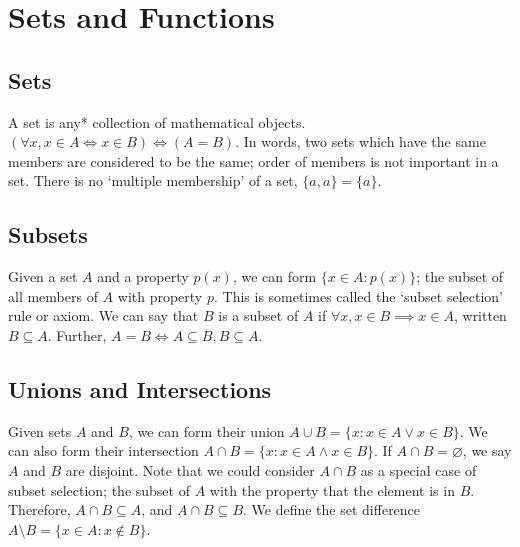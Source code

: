 \documentclass{article}
\begin{document}
	\section{Sets and Functions}
	\subsection{Sets}
	A set is any* collection of mathematical objects. $(\forall x, x \in A \iff x \in B) \iff (A = B)$. In words, two sets which have the same members are considered to be the same; order of members is not important in a set. There is no `multiple membership' of a set, $\{ a, a \} = \{ a \}$.
	
	\subsection{Subsets}
	Given a set $A$ and a property $p(x)$, we can form $\{ x \in A: p(x) \}$; the subset of all members of $A$ with property $p$. This is sometimes called the `subset selection' rule or axiom. We can say that $B$ is a subset of $A$ if $\forall x, x \in B \implies x \in A$, written $B \subseteq A$. Further, $A = B \iff A \subseteq B, B \subseteq A$.
	
	\subsection{Unions and Intersections}
	Given sets $A$ and $B$, we can form their union $A \cup B = \{ x: x \in A \vee x \in B \}$. We can also form their intersection $A \cap B = \{ x: x \in A \wedge x \in B \}$. If $A \cap B = \varnothing$, we say $A$ and $B$ are disjoint. Note that we could consider $A \cap B$ as a special case of subset selection; the subset of $A$ with the property that the element is in $B$. Therefore, $A \cap B \subseteq A$, and $A \cap B \subseteq B$. We define the set difference $A \setminus B = \{ x \in A: x \notin B \}$.
\end{document}

